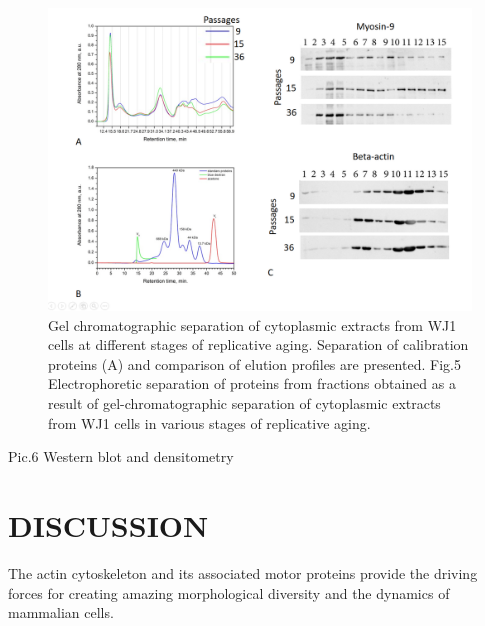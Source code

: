 \documentclass[english,authoryear]{elsarticle}
\begin{document}
\begin{figure}[hbt!]
\centering
\includegraphics[width=0.9\linewidth]{fig_fplc.png}
\caption{Gel chromatographic separation of cytoplasmic extracts from WJ1 cells at different stages of replicative aging. Separation of calibration proteins (A) and comparison of elution profiles are presented. Fig.5 Electrophoretic separation of proteins from fractions obtained as a result of gel-chromatographic separation of cytoplasmic extracts from WJ1 cells in various stages of replicative aging.}
\label{fpcl}
\end{figure}

Pic.6 Western blot and densitometry



\section{DISCUSSION}

The actin cytoskeleton and its associated motor proteins provide the driving forces for creating amazing morphological diversity and the dynamics of mammalian cells.
\end{document}
